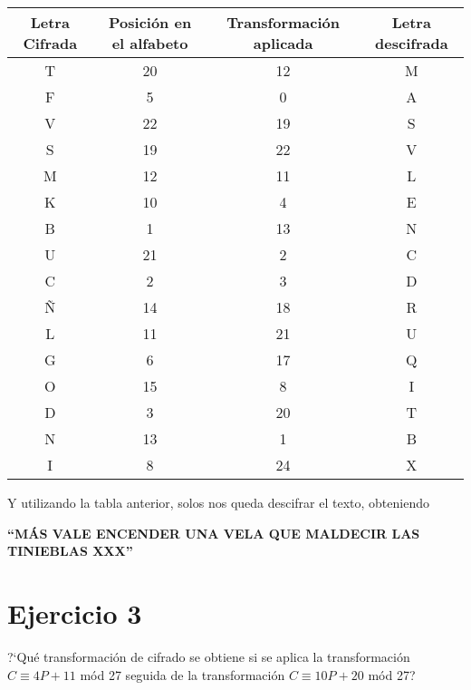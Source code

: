 \documentclass[12pt]{article}
\begin{document}
\begin{center}
    \begin{tabular}{|c|c|c|c|}
        \hline
            Letra Cifrada & Posición en el alfabeto & Transformación aplicada & Letra descifrada \\
        \hline            
            T &  20 & 12 & M \\
            F &  5 & 0 & A \\
            V &  22 & 19 & S \\
            S &  19 & 22 & V \\
            M &  12 & 11 & L \\
            K &  10 & 4 & E \\
            B &  1 & 13 & N \\
            U &  21 & 2 & C \\
            C &  2 & 3 & D \\
            Ñ &  14 & 18 & R \\
            L &  11 & 21 & U \\
            G &  6 & 17 & Q \\
            O &  15 & 8 & I \\
            D &  3 & 20 & T \\
            N &  13 & 1 & B \\
            I &  8 & 24 & X \\
        \hline
    \end{tabular}
\end{center}


Y utilizando la tabla anterior, solos nos queda descifrar el texto, obteniendo 

\begin{center}
    \textbf{
        “MÁS VALE  ENCENDER UNA VELA QUE MALDECIR LAS TINIEBLAS XXX”
    }
\end{center}





\section{Ejercicio 3}
    ?`Qué transformación de cifrado se obtiene si se aplica la transformación $C \equiv 4P + 11$ mód 27 seguida de la transformación $C \equiv 10P + 20$ mód 27?
\end{document}

